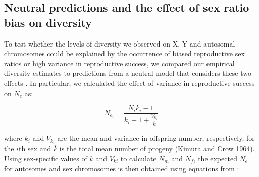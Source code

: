 \documentclass[9pt,twocolumn,twoside]{gsajnl}
\begin{document}

\subsection*{Neutral predictions and the effect of sex ratio bias on diversity}
To test whether the levels of diversity we observed on X, Y and autosomal chromosomes could be explained by the occurrence of biased reproductive sex ratios or high variance in reproductive success, we compared our empirical diversity estimates to predictions from a neutral model that considers these two effects \citep{kimura1964number}. In particular, we calculated the effect of variance in reproductive success on $N_{e}$ as:

\begin{equation}
N_{e_{i}}=\frac{N_{i}k_{i}-1}{k_{i}-1+\frac{V_{k_{i}}}{\overline{k}}} \label{eq:Vk}
\end{equation}

where $k_{i}$ and $V_{k_{i}}$ are the mean and variance in offspring number, respectively, for the $i$th sex and $\overline{k}$ is the total mean number of progeny (Kimura and Crow 1964). Using sex-specific values of $k$ and $V_{k{i}}$ to calculate $N_{m}$ and $N_{f}$, the expected $N_{e}$ for autosomes and sex chromosomes is then obtained using equations from \citep{wright1931evolution}:
\end{document}
